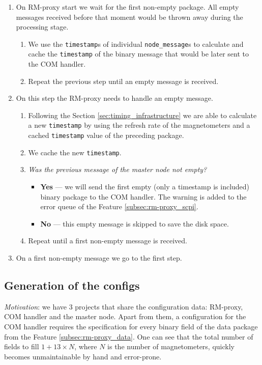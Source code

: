 \begin{enumerate}
	\item{
		On RM-proxy start we wait for the first non-empty package. All empty messages received before that moment would be thrown away during the processing stage.
		\begin{enumerate}
			\item We use the \texttt{timestamp}s of individual \texttt{node\_message}s to calculate and cache the \texttt{timestamp} of the binary message that would be later sent to the COM handler.
			\item Repeat the previous step until an empty message is received.
		\end{enumerate}
	}
	\item{
		On this step the RM-proxy needs to handle an empty message.
		\begin{enumerate}
			\item Following the Section \ref{sec:timing_infrastructure} we are able to calculate a new \texttt{timestamp} by using the refresh rate of the magnetometers and a cached \texttt{timestamp} value of the preceding package.
			\item We cache the new \texttt{timestamp}.
			\item{
				\textit{Was the previous message of the master node not empty?}
				\begin{itemize}
					\item \textbf{Yes} --- we will send the first empty (only a timestamp is included) binary package to the COM handler. The warning is added to the error queue of the Feature \ref{subsec:rm-proxy_scpi}.
					\item \textbf{No} --- this empty message is skipped to save the disk space.
				\end{itemize}
			}
			\item Repeat until a first non-empty message is received.
		\end{enumerate}
	}
	\item On a first non-empty message we go to the first step.
\end{enumerate}

\subsection{Generation of the configs}
\label{subsec:rm-proxy_configs}

\textit{Motivation}: we have 3 projects that share the configuration data: RM-proxy, COM handler and the master node. Apart from them, a configuration for the COM handler requires the specification for every binary field of the data package from the Feature \ref{subsec:rm-proxy_data}. One can see that the total number of fields to fill $1 + 13 \times N$, where $N$ is the number of magnetometers, quickly becomes unmaintainable by hand and error-prone.

